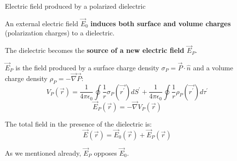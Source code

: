%
%
%

\begin{frame}{Electric field produced by a polarized dielectric}

An external electric field $\vec{E}_{0}$
{\bf induces both surface and volume charges} (polarization charges) to a dielectric.\\
\vspace{0.2cm}

The dielectric becomes the {\bf source of a new electric field $\vec{E}_{P}$}.\\
\vspace{0.2cm}

$\vec{E}_{P}$ is the field produced by a surface charge density
$\sigma_P = \vec{P} \cdot \hat{n}$ and a volume charge density $\rho_P = - \vec{\nabla} \vec{P}$:
\begin{equation*}
 V_P(\vec{r}) = \frac{1}{4\pi\epsilon_0} \oint \frac{1}{r} {\sigma}_P(\vec{r^{\prime}}) dS^{\prime} +
                \frac{1}{4\pi\epsilon_0} \oint \frac{1}{r} {\rho}_P(\vec{r^{\prime}}) d\tau^{\prime}
\end{equation*}
\begin{equation*}
 \vec{E}_{P}(\vec{r}) = - \vec{\nabla} V_P(\vec{r})
\end{equation*}

The total field in the presence of the dielectric is:
\begin{equation*}
 \vec{E}(\vec{r}) = \vec{E}_{0}(\vec{r}) + \vec{E}_{P}(\vec{r})
\end{equation*}

As we mentioned already, $\vec{E}_{P}$ opposes $\vec{E}_{0}$.

\end{frame}

%
%
%

